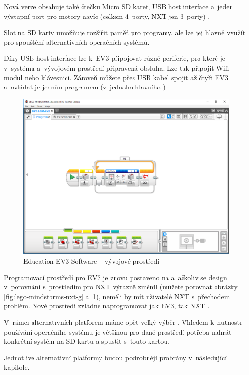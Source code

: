 
Nová verze obsahuje také čtečku Micro SD karet, USB host interface a~jeden výstupní port pro motory navíc (celkem 4~porty, NXT jen 3~porty) \cite{legoBotBench_comparing-EV3-and-NXT}. 

Slot na SD karty umožňuje rozšířit paměť pro programy, ale lze jej hlavně využít pro spouštění alternativních operačních systémů. 

Díky USB host interface lze k~EV3 připojovat různé periferie, pro které je v~systému a~vývojovém prostředí připravená obsluha.
Lze tak připojit Wifi modul nebo klávesnici. 
Zároveň můžete přes USB kabel spojit až čtyři EV3  a~ovládat je jedním programem (z~jednoho hlavního ).

\begin{figure}[h]
	\centering
	\includegraphics[width=\textwidth]{images/lego-mindstorms-ev3_dev-soft.png}
	\caption[\legoM{ }Education EV3 Software -- vývojové prostředí]{\legoM{ }Education EV3 Software -- vývojové prostředí}
	\label{fig:lego-mindstorms-ev3_dev-soft}
\end{figure}

Programovací prostředí pro EV3 je znovu postaveno na \labview{ }a~ačkoliv se design v~porovnání s~prostředím pro NXT výrazně změnil (můžete porovnat obrázky \ref{fig:lego-mindstorms-nxt-g} a~\ref{fig:lego-mindstorms-ev3_dev-soft}), neměli by mít uživatelé NXT s~přechodem problém. 
Nové prostředí zvládne naprogramovat jak EV3, tak NXT \brick{}.

V~rámci alternativních platforem máme opět velký výběr \cite{legoMindstormsWikipedia_programming-languages}. 
Vhledem k~nutnosti používání operačního systému je většinou pro dané prostředí potřeba nahrát konkrétní systém na SD kartu a spustit \brick{ }s~touto kartou.

Jednotlivé alternativní platformy budou podrobněji probrány v~následující kapitole.

